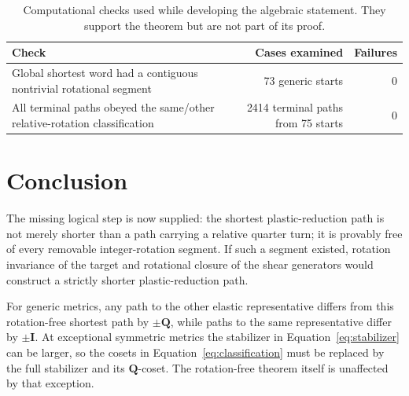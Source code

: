 \documentclass[11pt]{article}
\theoremstyle{definition}
\begin{document}
\begin{table}[htbp]
\centering
\caption{Computational checks used while developing the algebraic statement.
They support the theorem but are not part of its proof.}
\label{tab:checks}
\small
\renewcommand{\arraystretch}{1.22}
\begin{tabularx}{\textwidth}{@{}Xrr@{}}
\toprule
Check & Cases examined & Failures \\
\midrule
Global shortest word had a contiguous nontrivial rotational segment
 & 73 generic starts & 0 \\
All terminal paths obeyed the same/other relative-rotation classification
 & 2414 terminal paths from 75 starts & 0 \\
\bottomrule
\end{tabularx}
\end{table}

\section{Conclusion}

The missing logical step is now supplied: the shortest plastic-reduction
path is not merely shorter than a path carrying a relative quarter turn; it
is provably free of every removable integer-rotation segment.  If such a
segment existed, rotation invariance of the target and rotational closure of
the shear generators would construct a strictly shorter plastic-reduction path.

For generic metrics, any path to the other elastic representative differs
from this rotation-free shortest path by \(\pm\mathbf Q\), while paths to the
same representative differ by \(\pm\mathbf I\).  At exceptional symmetric
metrics the stabilizer in Equation~\eqref{eq:stabilizer} can be larger, so
the cosets in Equation~\eqref{eq:classification} must be replaced by the
full stabilizer and its \(\mathbf Q\)-coset.  The rotation-free theorem itself
is unaffected by that exception.
\end{document}
